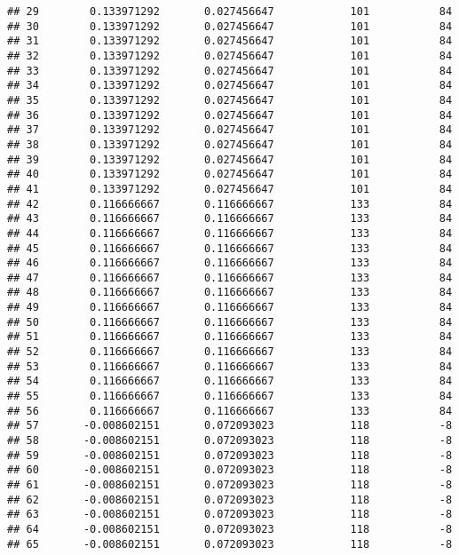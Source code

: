 \documentclass[]{article}
\begin{document}
\begin{verbatim}
## 29        0.133971292       0.027456647            101           84
## 30        0.133971292       0.027456647            101           84
## 31        0.133971292       0.027456647            101           84
## 32        0.133971292       0.027456647            101           84
## 33        0.133971292       0.027456647            101           84
## 34        0.133971292       0.027456647            101           84
## 35        0.133971292       0.027456647            101           84
## 36        0.133971292       0.027456647            101           84
## 37        0.133971292       0.027456647            101           84
## 38        0.133971292       0.027456647            101           84
## 39        0.133971292       0.027456647            101           84
## 40        0.133971292       0.027456647            101           84
## 41        0.133971292       0.027456647            101           84
## 42        0.116666667       0.116666667            133           84
## 43        0.116666667       0.116666667            133           84
## 44        0.116666667       0.116666667            133           84
## 45        0.116666667       0.116666667            133           84
## 46        0.116666667       0.116666667            133           84
## 47        0.116666667       0.116666667            133           84
## 48        0.116666667       0.116666667            133           84
## 49        0.116666667       0.116666667            133           84
## 50        0.116666667       0.116666667            133           84
## 51        0.116666667       0.116666667            133           84
## 52        0.116666667       0.116666667            133           84
## 53        0.116666667       0.116666667            133           84
## 54        0.116666667       0.116666667            133           84
## 55        0.116666667       0.116666667            133           84
## 56        0.116666667       0.116666667            133           84
## 57       -0.008602151       0.072093023            118           -8
## 58       -0.008602151       0.072093023            118           -8
## 59       -0.008602151       0.072093023            118           -8
## 60       -0.008602151       0.072093023            118           -8
## 61       -0.008602151       0.072093023            118           -8
## 62       -0.008602151       0.072093023            118           -8
## 63       -0.008602151       0.072093023            118           -8
## 64       -0.008602151       0.072093023            118           -8
## 65       -0.008602151       0.072093023            118           -8

\end{verbatim}
\end{document}

